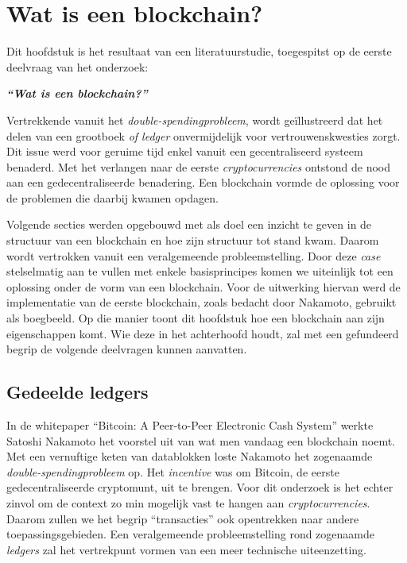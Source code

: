\chapter{Wat is een blockchain?}
\label{ch:wat-is-een-blockchain}


Dit hoofdstuk is het resultaat van een literatuurstudie, toegespitst op de eerste deelvraag van het onderzoek:

\begin{center}
	\textit{\textbf{``Wat is een blockchain?''}}
\end{center}

Vertrekkende vanuit het \textit{double-spendingprobleem}, wordt geïllustreerd dat het delen van een grootboek \textit{of ledger} onvermijdelijk voor vertrouwenskwesties zorgt. Dit issue werd voor geruime tijd enkel vanuit een gecentraliseerd systeem benaderd. Met het verlangen naar de eerste \textit{cryptocurrencies} ontstond de nood aan een gedecentraliseerde benadering. Een blockchain vormde de oplossing voor de problemen die daarbij kwamen opdagen.

Volgende secties werden opgebouwd met als doel een inzicht te geven in de structuur van een blockchain en hoe zijn structuur tot stand kwam. Daarom wordt vertrokken vanuit een veralgemeende probleemstelling. Door deze \textit{case} stelselmatig aan te vullen met enkele basisprincipes komen we uiteinlijk tot een oplossing onder de vorm van een blockchain. Voor de uitwerking hiervan werd de implementatie van de eerste blockchain, zoals bedacht door Nakamoto, gebruikt als boegbeeld. Op die manier toont dit hoofdstuk hoe een blockchain aan zijn eigenschappen komt. Wie deze in het achterhoofd houdt, zal met een gefundeerd begrip de volgende deelvragen kunnen aanvatten.



\section{Gedeelde ledgers}
\label{sec:gedeelde-ledgers}
In de whitepaper ``Bitcoin: A Peer-to-Peer Electronic Cash System'' werkte Satoshi Nakamoto het voorstel uit van wat men vandaag een blockchain noemt. Met een vernuftige keten van datablokken loste Nakamoto het zogenaamde \textit{double-spendingprobleem} op. Het \textit{incentive} was om Bitcoin, de eerste gedecentraliseerde cryptomunt, uit te brengen. Voor dit onderzoek is het echter zinvol om de context zo min mogelijk vast te hangen aan \textit{cryptocurrencies}. Daarom zullen we het begrip ``transacties'' ook opentrekken naar andere toepassingsgebieden. Een veralgemeende probleemstelling rond zogenaamde \textit{ledgers} zal het vertrekpunt vormen van een meer technische uiteenzetting.


